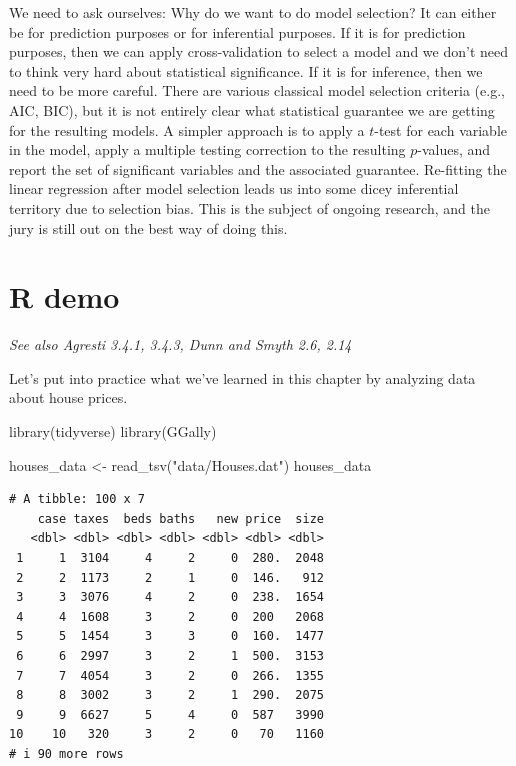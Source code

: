 \documentclass[
  11pt,
  letterpaper,
  oneside]{book}
\newenvironment{Shaded}{\begin{snugshade}}{\end{snugshade}}
\newcommand{\FunctionTok}[1]{\textcolor[rgb]{0.28,0.35,0.67}{#1}}
\newcommand{\NormalTok}[1]{\textcolor[rgb]{0.00,0.23,0.31}{#1}}
\newcommand{\OtherTok}[1]{\textcolor[rgb]{0.00,0.23,0.31}{#1}}
\newcommand{\StringTok}[1]{\textcolor[rgb]{0.13,0.47,0.30}{#1}}
\theoremstyle{definition}
\theoremstyle{plain}
\theoremstyle{plain}
\theoremstyle{plain}
\theoremstyle{remark}
\begin{document}
We need to ask ourselves: Why do we want to do model selection? It can
either be for prediction purposes or for inferential purposes. If it is
for prediction purposes, then we can apply cross-validation to select a
model and we don't need to think very hard about statistical
significance. If it is for inference, then we need to be more careful.
There are various classical model selection criteria (e.g., AIC, BIC),
but it is not entirely clear what statistical guarantee we are getting
for the resulting models. A simpler approach is to apply a \(t\)-test
for each variable in the model, apply a multiple testing correction to
the resulting \(p\)-values, and report the set of significant variables
and the associated guarantee. Re-fitting the linear regression after
model selection leads us into some dicey inferential territory due to
selection bias. This is the subject of ongoing research, and the jury is
still out on the best way of doing this.

\hypertarget{r-demo}{%
\chapter{R demo}\label{r-demo}}

\emph{See also Agresti 3.4.1, 3.4.3, Dunn and Smyth 2.6, 2.14}

Let's put into practice what we've learned in this chapter by analyzing
data about house prices.

\begin{Shaded}
\begin{Highlighting}[]
\FunctionTok{library}\NormalTok{(tidyverse)}
\FunctionTok{library}\NormalTok{(GGally)}

\NormalTok{houses\_data }\OtherTok{\textless{}{-}} \FunctionTok{read\_tsv}\NormalTok{(}\StringTok{"data/Houses.dat"}\NormalTok{)}
\NormalTok{houses\_data}
\end{Highlighting}
\end{Shaded}

\begin{verbatim}
# A tibble: 100 x 7
    case taxes  beds baths   new price  size
   <dbl> <dbl> <dbl> <dbl> <dbl> <dbl> <dbl>
 1     1  3104     4     2     0  280.  2048
 2     2  1173     2     1     0  146.   912
 3     3  3076     4     2     0  238.  1654
 4     4  1608     3     2     0  200   2068
 5     5  1454     3     3     0  160.  1477
 6     6  2997     3     2     1  500.  3153
 7     7  4054     3     2     0  266.  1355
 8     8  3002     3     2     1  290.  2075
 9     9  6627     5     4     0  587   3990
10    10   320     3     2     0   70   1160
# i 90 more rows
\end{verbatim}
\end{document}
